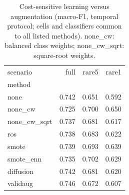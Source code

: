 \begin{table}[t]
\centering\small
\caption{Cost-sensitive learning versus augmentation (macro-F1, temporal protocol; cells and classifiers common to all listed methods). none\_cw: balanced class weights; none\_cw\_sqrt: square-root weights.}
\label{tab:cw}
\begin{tabular}{lrrr}
\toprule
scenario & full & rare5 & rare1 \\
method &  &  &  \\
\midrule
none & 0.742 & 0.651 & 0.592 \\
none\_cw & 0.725 & 0.700 & 0.650 \\
none\_cw\_sqrt & 0.737 & 0.681 & 0.617 \\
ros & 0.738 & 0.683 & 0.622 \\
smote & 0.739 & 0.693 & 0.639 \\
smote\_enn & 0.735 & 0.702 & 0.629 \\
diffusion & 0.742 & 0.681 & 0.620 \\
validaug & 0.746 & 0.672 & 0.607 \\
\bottomrule
\end{tabular}
\end{table}
